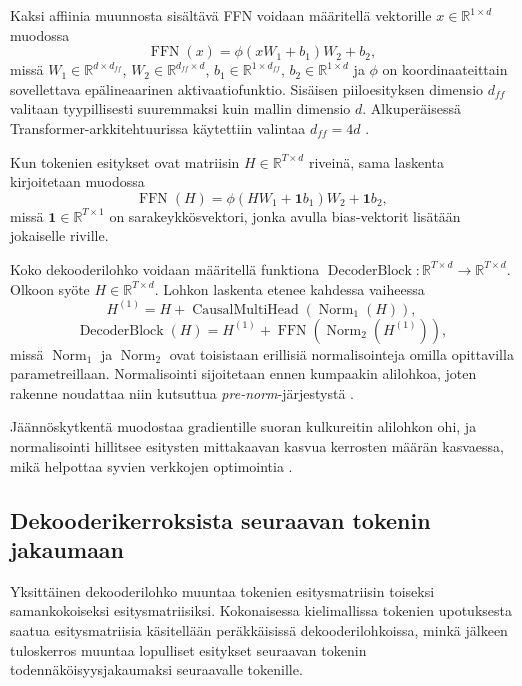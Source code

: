 Kaksi affiinia muunnosta sisältävä FFN voidaan määritellä
vektorille \(x \in \mathbb{R}^{1 \times d}\) muodossa
$$
\operatorname{FFN}(x)
=
\phi(x W_1 + b_1) W_2 + b_2,
$$
missä \(W_1 \in \mathbb{R}^{d \times d_{ff}}\),
\(W_2 \in \mathbb{R}^{d_{ff} \times d}\),
\(b_1 \in \mathbb{R}^{1 \times d_{ff}}\),
\(b_2 \in \mathbb{R}^{1 \times d}\) ja \(\phi\) on
koordinaateittain sovellettava epälineaarinen aktivaatiofunktio.
Sisäisen piiloesityksen dimensio \(d_{ff}\) valitaan
tyypillisesti suuremmaksi kuin mallin dimensio \(d\).
Alkuperäisessä Transformer-arkkitehtuurissa käytettiin
valintaa \(d_{ff} = 4d\) \cite{vaswani2017attention}.

Kun tokenien esitykset ovat matriisin
\(H \in \mathbb{R}^{T \times d}\) riveinä, sama laskenta
kirjoitetaan muodossa
$$
\operatorname{FFN}(H)
=
\phi\left(
  H W_1 + \mathbf{1} b_1
\right) W_2
+
\mathbf{1} b_2,
$$
missä \(\mathbf{1} \in \mathbb{R}^{T \times 1}\) on sarakeykkösvektori,
jonka avulla bias-vektorit lisätään jokaiselle riville.

Koko dekooderilohko voidaan määritellä funktiona
\(\operatorname{DecoderBlock} \colon \mathbb{R}^{T \times d} \to \mathbb{R}^{T \times d}\).
Olkoon syöte \(H \in \mathbb{R}^{T \times d}\). Lohkon laskenta
etenee kahdessa vaiheessa
$$
H^{(1)} = H + \operatorname{CausalMultiHead}(\operatorname{Norm}_1(H)),
$$
$$
\operatorname{DecoderBlock}(H) = H^{(1)} + \operatorname{FFN}(\operatorname{Norm}_2(H^{(1)})),
$$
missä \(\operatorname{Norm}_1\) ja
\(\operatorname{Norm}_2\) ovat toisistaan erillisiä
normalisointeja omilla opittavilla parametreillaan.
Normalisointi sijoitetaan ennen kumpaakin alilohkoa, joten rakenne
noudattaa niin kutsuttua \emph{pre-norm}-järjestystä
\cite{xiong2020layer}.

Jäännöskytkentä muodostaa gradientille suoran kulkureitin
alilohkon ohi, ja normalisointi hillitsee esitysten mittakaavan
kasvua kerrosten määrän kasvaessa, mikä helpottaa syvien verkkojen
optimointia \cite{he2016deep, xiong2020layer}.

\subsection{Dekooderikerroksista seuraavan tokenin jakaumaan}

Yksittäinen dekooderilohko muuntaa tokenien esitysmatriisin toiseksi samankokoiseksi esitysmatriisiksi. Kokonaisessa kielimallissa tokenien upotuksesta saatua esitysmatriisia käsitellään peräkkäisissä dekooderilohkoissa, minkä jälkeen tuloskerros muuntaa lopulliset esitykset seuraavan tokenin todennäköisyysjakaumaksi seuraavalle tokenille.

